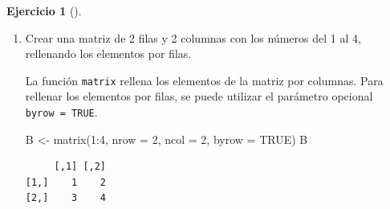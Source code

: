 \documentclass[
  spanish,
  a4paper,
]{scrreport}
\newenvironment{Shaded}{\begin{snugshade}}{\end{snugshade}}
\newcommand{\AttributeTok}[1]{\textcolor[rgb]{0.40,0.45,0.13}{#1}}
\newcommand{\ConstantTok}[1]{\textcolor[rgb]{0.56,0.35,0.01}{#1}}
\newcommand{\DecValTok}[1]{\textcolor[rgb]{0.68,0.00,0.00}{#1}}
\newcommand{\FunctionTok}[1]{\textcolor[rgb]{0.28,0.35,0.67}{#1}}
\newcommand{\NormalTok}[1]{\textcolor[rgb]{0.00,0.23,0.31}{#1}}
\newcommand{\OtherTok}[1]{\textcolor[rgb]{0.00,0.23,0.31}{#1}}
\newcommand{\SpecialCharTok}[1]{\textcolor[rgb]{0.37,0.37,0.37}{#1}}
\theoremstyle{definition}
\newtheorem{exercise}{Ejercicio}[chapter]
\theoremstyle{remark}
\begin{document}
\begin{exercise}[]
\begin{enumerate}
\begin{tcolorbox}
  La función \texttt{cbind(matriz,\ vector)} permite añadir una nueva
  columna a la matriz \texttt{matriz} con los datos de \texttt{vector}.

\begin{Shaded}
\begin{Highlighting}[]
\NormalTok{A }\OtherTok{\textless{}{-}} \FunctionTok{cbind}\NormalTok{(A, }\DecValTok{5}\SpecialCharTok{:}\DecValTok{6}\NormalTok{)}
\NormalTok{A}
\end{Highlighting}
\end{Shaded}

\begin{verbatim}
     [,1] [,2] [,3]
[1,]    1    3    5
[2,]    2    4    6
\end{verbatim}

  \end{tcolorbox}
\item
  Crear una matriz de 2 filas y 2 columnas con los números del 1 al 4,
  rellenando los elementos por filas.

  \begin{tcolorbox}[enhanced jigsaw, titlerule=0mm, arc=.35mm, rightrule=.15mm, opacitybacktitle=0.6, leftrule=.75mm, colframe=quarto-callout-tip-color-frame, toptitle=1mm, breakable, colbacktitle=quarto-callout-tip-color!10!white, bottomrule=.15mm, colback=white, left=2mm, bottomtitle=1mm, opacityback=0, title=\textcolor{quarto-callout-tip-color}{\faLightbulb}\hspace{0.5em}{Solución}, toprule=.15mm, coltitle=black]

  La función \texttt{matrix} rellena los elementos de la matriz por
  columnas. Para rellenar los elementos por filas, se puede utilizar el
  parámetro opcional \texttt{byrow\ =\ TRUE}.

\begin{Shaded}
\begin{Highlighting}[]
\NormalTok{B }\OtherTok{\textless{}{-}} \FunctionTok{matrix}\NormalTok{(}\DecValTok{1}\SpecialCharTok{:}\DecValTok{4}\NormalTok{, }\AttributeTok{nrow =} \DecValTok{2}\NormalTok{, }\AttributeTok{ncol =} \DecValTok{2}\NormalTok{, }\AttributeTok{byrow =} \ConstantTok{TRUE}\NormalTok{)}
\NormalTok{B}
\end{Highlighting}
\end{Shaded}

\begin{verbatim}
     [,1] [,2]
[1,]    1    2
[2,]    3    4
\end{verbatim}


\end{tcolorbox}
\end{enumerate}
\end{exercise}
\end{document}
